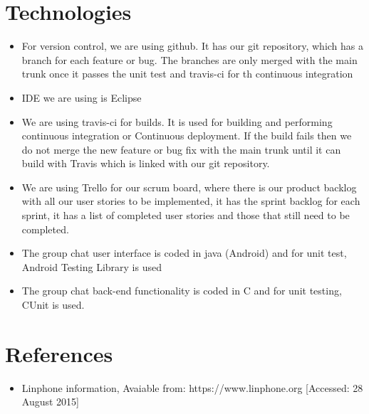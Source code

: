 \documentclass[a4paper]{article}
\begin{document}
\section{Technologies}
\begin{itemize}
\item For version control, we are using github. It has our git repository, which has a branch for each feature or bug. The branches are only merged with the main trunk once it passes the unit test and travis-ci for th continuous integration\\
\item IDE we are using is Eclipse\\
\item We are using travis-ci for builds. It is used for building and performing continuous integration or Continuous deployment. If the build fails then we do not merge the new feature or bug fix with the main trunk until it can build with Travis which is linked with our git repository.\\
\item We are using Trello for our scrum board, where there is our product backlog with all our user stories to be implemented, it has the sprint backlog for each sprint, it has a list of completed user stories and those that still need to be completed.\\
\item The group chat user interface is coded in java (Android) and for unit test, Android Testing Library is used\\
\item The group chat back-end functionality is coded in C and for unit testing, CUnit is used.

\end{itemize}

\section{References}
\begin{itemize}
\item Linphone information, Avaiable from: https://www.linphone.org [Accessed: 28 August 2015]
\end{itemize}
\end{document}
